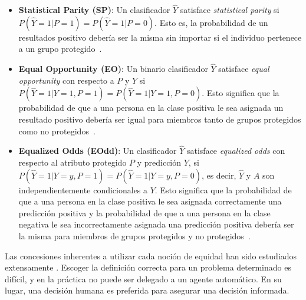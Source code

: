 

 \begin{itemize}
     \item \textbf{Statistical Parity (SP)}: Un clasificador $\hat{Y}$ satisface \emph{statistical parity} si $P(\hat{Y}=1|P=1) = P(\hat{Y}=1|P=0)$.
     Esto es, la probabilidad de un resultados positivo debería ser la misma sin importar si el individuo pertenece a un grupo protegido~\parencite{verma2018fairness}.
     \item \textbf{Equal Opportunity (EO)}: Un binario clasificador $\hat{Y}$ satisface \emph{equal opportunity} con respecto a $P$ y $Y$ si $P(\hat{Y}=1|Y=1,P=1) = P(\hat{Y}=1|Y=1,P=0)$.
     Esto significa que la probabilidad de que a una persona en la clase positiva le sea asignada un resultado positivo debería ser igual para miembros tanto de grupos protegidos como no protegidos~\parencite{verma2018fairness}.
     \item \textbf{Equalized Odds (EOdd)}: Un clasificador $\hat{Y}$ satisface \emph{equalized odds} con respecto al atributo protegido $P$ y predicción $Y$, si $P(\hat{Y}=1|Y=y,P=1) = P(\hat{Y}=1|Y=y,P=0)$, es decir, $\hat{Y}$ y $A$ son independientemente condicionales a $Y$.
     Esto significa que la probabilidad de que a una persona en la clase positiva le sea asignada correctamente una predicción positiva y la probabilidad de que a una persona en la clase negativa le sea incorrectamente asignada una predicción positiva debería ser la misma para miembros de grupos protegidos y no protegidos~\cite{verma2018fairness}.
 \end{itemize}

Las concesiones inherentes a utilizar cada noción de equidad han sido estudiados extensamente \parencite{dwork2012fairness, friedler2016possibility, kleinberg2018inherent}.
Escoger la definición correcta para un problema determinado es difícil, y en la práctica no puede ser delegado a un agente automático.
En su lugar, una decisión humana es preferida para asegurar una decisión informada.

